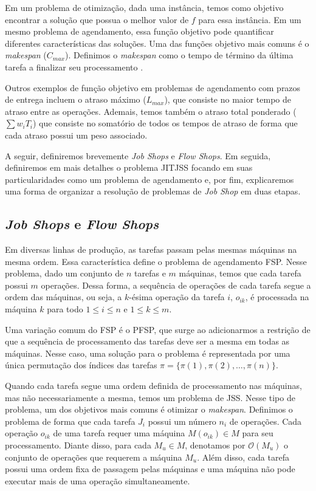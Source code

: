 Em um problema de otimização, dada uma instância, temos como objetivo encontrar a solução que possua o melhor valor de $f$ para essa instância. Em um mesmo problema de agendamento, essa função objetivo pode quantificar diferentes características das soluções. Uma das funções objetivo mais comuns é o \textit{makespan} ($C_{max}$). Definimos o \textit{makespan} como o tempo de término da última tarefa a finalizar seu processamento \citep{pinedo2008}.

Outros exemplos de função objetivo em problemas de agendamento com prazos de entrega incluem o atraso máximo ($L_{max}$), que consiste no maior tempo de atraso entre as operações. Ademais, temos também o atraso total ponderado ($\sum w_iT_i$) que consiste no somatório de todos os tempos de atraso de forma que cada atraso possui um peso associado.

A seguir, definiremos brevemente \textit{Job Shops} e \textit{Flow Shops}. Em seguida, definiremos em mais detalhes o problema \ac{JITJSS} focando em suas particularidades como um problema de agendamento e, por fim, explicaremos uma forma de organizar a resolução de problemas de \textit{Job Shop} em duas etapas.

\subsection{\textit{Job Shops} e \textit{Flow Shops}}

Em diversas linhas de produção, as tarefas passam pelas mesmas máquinas na mesma ordem. Essa característica define o problema de agendamento \ac{FSP}. Nesse problema, dado um conjunto de $n$ tarefas e $m$ máquinas, temos que cada tarefa possui $m$ operações. Dessa forma, a sequência de operações de cada tarefa segue a ordem das máquinas, ou seja, a $k$-ésima operação da tarefa $i$, $o_{ik}$, é processada na máquina $k$ para todo $1 \leq i \leq n$ e $1 \leq k \leq m$.

Uma variação comum do \ac{FSP} é o \ac{PFSP}, que surge ao adicionarmos a restrição de que a sequência de processamento das tarefas deve ser a mesma em todas as máquinas. Nesse caso, uma solução para o problema é representada por uma única permutação dos índices das tarefas $\pi = \{\pi(1), \pi(2), \ldots, \pi(n)\}$.

Quando cada tarefa segue uma ordem definida de processamento nas máquinas, mas não necessariamente a mesma, temos um problema de \ac{JSS}. Nesse tipo de problema, um dos objetivos mais comuns é otimizar o \textit{makespan}. Definimos o problema de forma que cada tarefa $J_i$ possui um número $n_i$ de operações. Cada operação $o_{ik}$ de uma tarefa requer uma máquina $M\left(o_{ik}\right) \in M$ para seu processamento. Diante disso, para cada $M_u\in M$, denotamos por $\mathcal{O}\left(M_u\right)$ o conjunto de operações que requerem a máquina $M_u$. Além disso, cada tarefa possui uma ordem fixa de passagem pelas máquinas e uma máquina não pode executar mais de uma operação simultaneamente.

